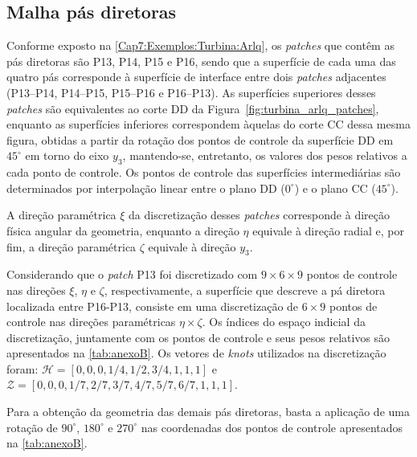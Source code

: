 \begin{apendicesenv}
\chapter{Malha pás diretoras}\label{apendice:malhaPasDiretoras}

Conforme exposto na \autoref{Cap7:Exemplos:Turbina:Arlq}, os \textit{patches} que contêm as pás diretoras são P13, P14, P15 e P16, sendo que a superfície de cada uma das quatro pás corresponde à superfície de interface entre dois \textit{patches} adjacentes (P13–P14, P14–P15, P15–P16 e P16–P13). As superfícies superiores desses \textit{patches} são equivalentes ao corte DD da Figura~\ref{fig:turbina_arlq_patches}, enquanto as superfícies inferiores correspondem àquelas do corte CC dessa mesma figura, obtidas a partir da rotação dos pontos de controle da superfície DD em $45^\circ$ em torno do eixo $y_3$, mantendo-se, entretanto, os valores dos pesos relativos a cada ponto de controle.
Os pontos de controle das superfícies intermediárias são determinados por interpolação linear entre o plano DD ($0^\circ$) e o plano CC ($45^\circ$).

A direção paramétrica $\xi$ da discretização desses \textit{patches} corresponde à direção física angular da geometria, enquanto a direção $\eta$ equivale à direção radial e, por fim, a direção paramétrica $\zeta$ equivale à direção $y_3$.

Considerando que o \textit{patch} P13 foi discretizado com $9\times6\times9$ pontos de controle nas direções $\xi$, $\eta$ e $\zeta$, respectivamente, a superfície que descreve a pá diretora localizada entre P16-P13, consiste em uma discretização de $6\times9$ pontos de controle nas direções paramétricas $\eta\times\zeta$. Os índices do espaço indicial da discretização, juntamente com os pontos de controle e seus pesos relativos são apresentados na \autoref{tab:anexoB}. Os vetores de \textit{knots} utilizados na discretização foram: $\mathcal{H} = [0,0,0,1/4,1/2,3/4,1,1,1]$ e $\mathcal{Z} = [0,0,0,1/7,2/7,3/7,4/7,5/7,6/7,1,1,1]$.

Para a obtenção da geometria das demais pás diretoras, basta a aplicação de uma rotação de $90^\circ$, $180^\circ$ e $270^\circ$ nas coordenadas dos pontos de controle apresentados na \autoref{tab:anexoB}.



\end{apendicesenv}
